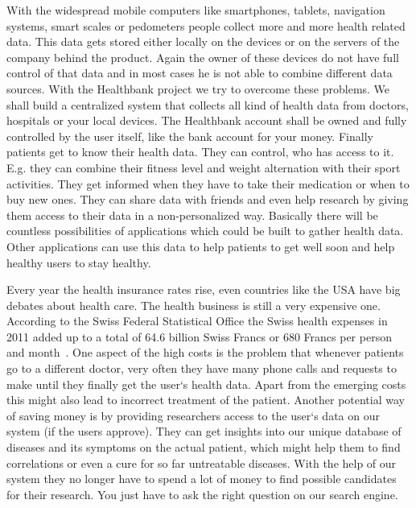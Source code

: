With the widespread mobile computers like smartphones, tablets, navigation systems, smart scales or pedometers people collect more and more health related data. This data gets stored either locally on the devices or on the servers of the company behind the product. Again the owner of these devices do not have full control of that data and in most cases he is not able to combine different data sources. \newline
With the Healthbank project we try to overcome these problems. We shall build a centralized system that collects all kind of health data from doctors, hospitals or your local devices. The Healthbank account shall be owned and fully controlled by the user itself, like the bank account for your money. Finally patients get to know their health data. They can control, who has access to it. E.g. they can combine their fitness level and weight alternation with their sport activities. They get informed when they have to take their medication or when to buy new ones. They can share data with friends and even help research by giving them access to their data in a non-personalized way. Basically there will be countless possibilities of applications which could be built to gather health data. Other applications can use this data to help patients to get well soon and help healthy users to stay healthy. 

Every year the health insurance rates rise, even countries like the USA have big debates about health care. The health business is still a very expensive one. According to the Swiss Federal Statistical Office the Swiss health expenses in 2011 added up to a total of 64.6 billion Swiss Francs or 680 Francs per person and month~\cite{bfsadmin}. One aspect of the high costs is the problem that whenever patients go to a different doctor, very often they have many phone calls and requests to make until they finally get the user`s health data. Apart from the emerging costs this might also lead to incorrect treatment of the patient. \newline
Another potential way of saving money is by providing researchers access to the user`s data on our system (if the users approve). They can get insights into our unique database of diseases and its symptoms on the actual patient, which might help them to find correlations or even a cure for so far untreatable diseases. With the help of our system they no longer have to spend a lot of money to find possible candidates for their research. You just have to ask the right question on our search engine.

